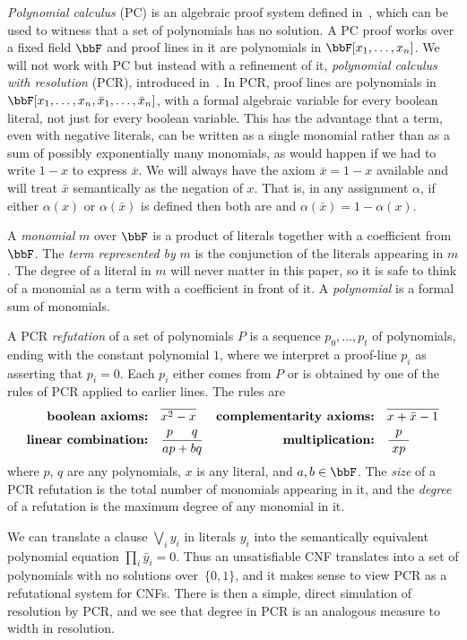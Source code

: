  
\emph{Polynomial calculus} (PC) is an algebraic proof system defined in~\cite{DBLP:conf/stoc/CleggEI96},
which can be used to witness that a set of polynomials has no solution.
A PC proof  works over a fixed field $\bbF$ and proof lines in it are polynomials in $\bbF[x_1,\ldots,x_n]$. 
We will not work with PC but instead with a refinement of it, 
\emph{polynomial calculus with resolution} (PCR), introduced in~\cite{ABRW}.
In PCR, proof lines are polynomials in $\bbF[x_1, \dots, x_n, \bar{x}_1, \dots, \bar{x}_n]$,
with a formal algebraic variable for every boolean literal, not just for every boolean variable.
This has the advantage that a term, even with negative literals, 
can be written as a single monomial rather than as
a sum of possibly exponentially many monomials, as would happen if we had to write  $1-x$
to express $\bar{x}$. We will always have the axiom $\bar{x} = 1-x$ available and will treat 
$\bar{x}$ semantically as the negation of $x$. That is, in any assignment $\alpha$,
 if either $\alpha(x)$ or $\alpha(\bar{x})$ is defined then both 
are and $\alpha(\bar{x}) = 1-\alpha(x)$.

A \emph{monomial} $m$ over $\bbF$ is a product of literals together with a coefficient from $\bbF$.
The \emph{term represented by} $m$ is the conjunction of the literals appearing in $m$.
The degree of a literal in $m$ will never matter in this paper, so it is safe to think of a monomial
as a term with a coefficient in front of it. A \emph{polynomial} is a formal sum of monomials.

A PCR \emph{refutation} of a set of polynomials $P$
is a sequence $p_0, \dots, p_t$ of polynomials, ending with the constant polynomial $1$,
 where we interpret a proof-line $p_i$ as asserting
that $p_i =0$.
Each $p_i$ either comes from $P$ or is obtained by one of the rules
of PCR applied to earlier lines. The rules are
\begin{align*}
\textbf{boolean axioms:} &\quad  \overline{x^2-x}& 
\textbf{complementarity axioms:} & \quad \overline{x+\bar{x}-1^{\vphantom 2}} \\
\textbf{linear combination:} &\quad \frac{p \quad \, \, \, q}{ap+bq}  &
\textbf{multiplication:} &\quad \frac{\;\; p \;\;}{xp}
\end{align*}
where $p$, $q$ are any polynomials, $x$ is any literal, and $a,b\in\bbF$.
The \emph{size} of a PCR refutation is the total number of monomials appearing in it,
and the \emph{degree} of a refutation is the maximum degree of any monomial in it.

We can translate a clause $\bigvee_i y_i$ in literals $y_i$
into the semantically equivalent polynomial equation $\prod_i  \bar{y}_i = 0$.
Thus an unsatisfiable CNF translates into
 a set of polynomials with no solutions 
over~$\{0,1\}$, and it makes sense to view PCR as a refutational system for CNFs.
There is then a simple, direct simulation of resolution by PCR, and we see that
degree in PCR is an analogous measure to width in resolution.

